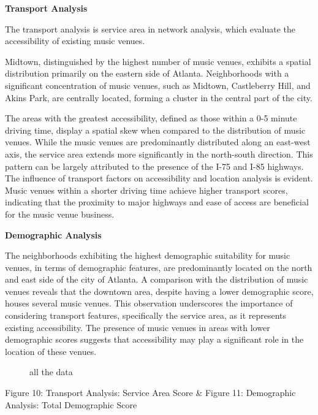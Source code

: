 \documentclass[11pt]{article}
\begin{document}
\textbf{Transport Analysis}

The transport analysis is service area in network analysis, which evaluate the accessibility of existing music venues. 

Midtown, distinguished by the highest number of music venues, exhibits a spatial distribution primarily on the eastern side of Atlanta. Neighborhoods with a significant concentration of music venues, such as Midtown, Castleberry Hill, and Akins Park, are centrally located, forming a cluster in the central part of the city.

The areas with the greatest accessibility, defined as those within a 0-5 minute driving time, display a spatial skew when compared to the distribution of music venues. While the music venues are predominantly distributed along an east-west axis, the service area extends more significantly in the north-south direction. This pattern can be largely attributed to the presence of the I-75 and I-85 highways. The influence of transport factors on accessibility and location analysis is evident. Music venues within a shorter driving time achieve higher transport scores, indicating that the proximity to major highways and ease of access are beneficial for the music venue business.

\textbf{Demographic Analysis}

The neighborhoods exhibiting the highest demographic suitability for music venues, in terms of demographic features, are predominantly located on the north and east side of the city of Atlanta. A comparison with the distribution of music venues reveals that the downtown area, despite having a lower demographic score, houses several music venues. This observation underscores the importance of considering transport features, specifically the service area, as it represents existing accessibility. The presence of music venues in areas with lower demographic scores suggests that accessibility may play a significant role in the location of these venues.

\begin{figure}[H] 
    \centering
    \hfill%
    \caption{all the data}
\end{figure}

\begin{center}
\centering
Figure 10: Transport Analysis: Service Area Score \& Figure 11: Demographic Analysis: Total Demographic Score
\end{center}
\end{document}
